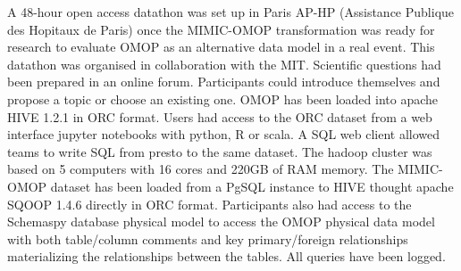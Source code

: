 A 48-hour open access datathon \cite{mimic-omop-datathon} was set up in Paris AP-HP 
(Assistance Publique des Hopitaux de Paris) once the MIMIC-OMOP transformation was 
ready for research to evaluate OMOP as an alternative data model in a real event. 
This datathon was organised in collaboration with the MIT.
Scientific questions had been prepared in an online forum. Participants could 
introduce themselves and propose a topic or choose an existing one. 
OMOP has been loaded into apache HIVE 1.2.1 in ORC format. Users had access to 
the ORC dataset from a web interface jupyter notebooks with python, R or scala. 
A SQL web client allowed teams to write SQL from presto to the same dataset. 
The hadoop cluster was based on 5 computers with 16 cores and 220GB of RAM memory. 
The MIMIC-OMOP dataset has been loaded from a PgSQL instance to HIVE thought apache 
SQOOP 1.4.6 directly in ORC format. Participants also had access to the Schemaspy 
database physical model to access the OMOP physical data model with both 
table/column comments and key primary/foreign relationships materializing the 
relationships between the tables. All queries have been logged.

